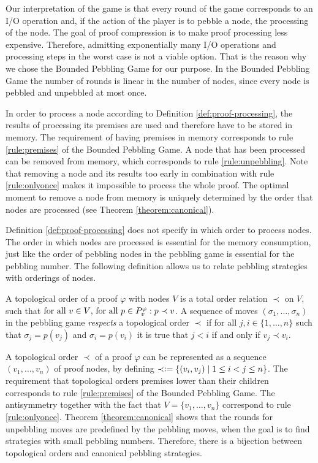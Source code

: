 Our interpretation of the game is that every round of the game corresponds to an I/O operation and, if the action of the player is to pebble a node, the processing of the node.
The goal of proof compression is to make proof processing less expensive.
Therefore, admitting exponentially many I/O operations and processing steps in the worst case is not a viable option.
That is the reason why we chose the Bounded Pebbling Game for our purpose.
In the Bounded Pebbling Game the number of rounds is linear in the number of nodes, since every node is pebbled and unpebbled at most once.

In order to process a node according to Definition \ref{def:proof-processing}, the results of processing its premises are used and therefore have to be stored in memory.
The requirement of having premises in memory corresponds to rule \ref{rule:premises} of the Bounded Pebbling Game. 
A node that has been processed can be removed from memory, which corresponds to rule \ref{rule:unpebbling}.
Note that removing a node and its results too early in combination with rule \ref{rule:onlyonce} makes it impossible to process the whole proof.
The optimal moment to remove a node from memory is uniquely determined by the order that nodes are processed (see Theorem \ref{theorem:canonical}).

Definition \ref{def:proof-processing} does not specify in which order to process nodes.
The order in which nodes are processed is essential for the memory consumption, just like the order of pebbling nodes in the pebbling game is essential for the pebbling number.
The following definition allows us to relate pebbling strategies with orderings of nodes.

\begin{definition}
\label{def:topological-order}
A topological order of a proof $\varphi$ with nodes $V$ is a total order relation $\prec$ on $V$, such that 
$\text{for all } v \in V \text{, for all } p \in P_{v}^{\varphi}:
p \prec v$.
A sequence of moves $(\sigma_1,\ldots,\sigma_n)$ in the pebbling game \emph{respects} a topological order $\prec$ if for all $j,i \in \{1,\ldots,n\}$ such that $\sigma_j = p(v_j)$ and $\sigma_i = p(v_i)$ it is true that $j < i$ if and only if $v_j \prec v_i$.
\end{definition}

A topological order $\prec$ of a proof $\varphi$ can be represented as a sequence $(v_1,\dots,v_n)$ of proof nodes, by defining $\prec \mathrel{\mathop:}= \{(v_i,v_j) \mid 1 \leq i < j \leq n\}$. 
The requirement that topological orders premises lower than their children corresponds to rule \ref{rule:premises} of the Bounded Pebbling Game.
The antisymmetry together with the fact that $V = \{v_1,\dots,v_n\}$ correspond to rule \ref{rule:onlyonce}.
Theorem \ref{theorem:canonical} shows that the rounds for unpebbling moves are predefined by the pebbling moves, when the goal is to find strategies with small pebbling numbers.
Therefore, there is a bijection between topological orders and canonical pebbling strategies.

